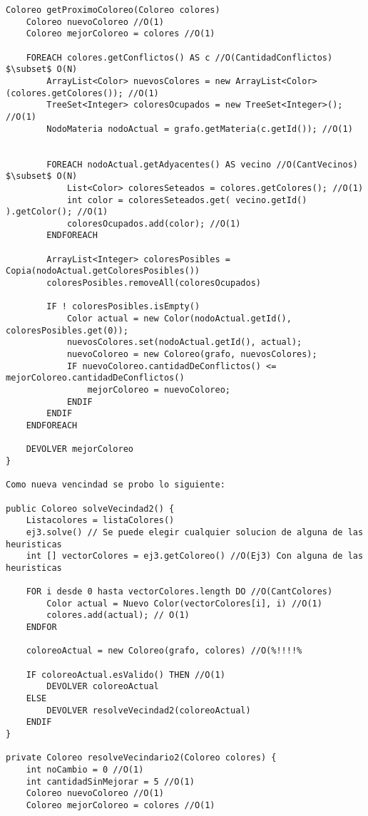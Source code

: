 \begin{verbatim}
Coloreo getProximoColoreo(Coloreo colores)
    Coloreo nuevoColoreo //O(1)
    Coloreo mejorColoreo = colores //O(1)

    FOREACH colores.getConflictos() AS c //O(CantidadConflictos) $\subset$ O(N)
        ArrayList<Color> nuevosColores = new ArrayList<Color>(colores.getColores()); //O(1)
        TreeSet<Integer> coloresOcupados = new TreeSet<Integer>(); //O(1)
        NodoMateria nodoActual = grafo.getMateria(c.getId()); //O(1)


        FOREACH nodoActual.getAdyacentes() AS vecino //O(CantVecinos) $\subset$ O(N)
            List<Color> coloresSeteados = colores.getColores(); //O(1)
            int color = coloresSeteados.get( vecino.getId() ).getColor(); //O(1)
            coloresOcupados.add(color); //O(1)
        ENDFOREACH

        ArrayList<Integer> coloresPosibles = Copia(nodoActual.getColoresPosibles())
        coloresPosibles.removeAll(coloresOcupados)

        IF ! coloresPosibles.isEmpty()
            Color actual = new Color(nodoActual.getId(), coloresPosibles.get(0));
            nuevosColores.set(nodoActual.getId(), actual);
            nuevoColoreo = new Coloreo(grafo, nuevosColores);
            IF nuevoColoreo.cantidadDeConflictos() <= mejorColoreo.cantidadDeConflictos()
                mejorColoreo = nuevoColoreo;
            ENDIF
        ENDIF
    ENDFOREACH

    DEVOLVER mejorColoreo
}

Como nueva vencindad se probo lo siguiente:

public Coloreo solveVecindad2() {
    Listacolores = listaColores()
    ej3.solve() // Se puede elegir cualquier solucion de alguna de las heuristicas
    int [] vectorColores = ej3.getColoreo() //O(Ej3) Con alguna de las heuristicas

    FOR i desde 0 hasta vectorColores.length DO //O(CantColores)
        Color actual = Nuevo Color(vectorColores[i], i) //O(1)
        colores.add(actual); // O(1)
    ENDFOR

    coloreoActual = new Coloreo(grafo, colores) //O(%!!!!%

    IF coloreoActual.esValido() THEN //O(1)
        DEVOLVER coloreoActual
    ELSE
        DEVOLVER resolveVecindad2(coloreoActual)
    ENDIF
}

private Coloreo resolveVecindario2(Coloreo colores) {
    int noCambio = 0 //O(1)
    int cantidadSinMejorar = 5 //O(1)
    Coloreo nuevoColoreo //O(1)
    Coloreo mejorColoreo = colores //O(1)


\end{verbatim}
